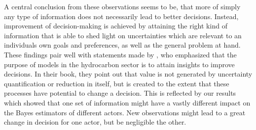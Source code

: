 	A central conclusion from these observations seems to be, that more of simply any type of information does not necessarily lead to better decisions. Instead, improvement of decision-making is achieved by attaining the right kind of information that is able to shed light on uncertainties which are relevant to an individuals own goals and preferences, as well as the general problem at hand. These findings pair well with statements made by \citet{bratvold2010making}, who emphasized that the purpose of models in the hydrocarbon sector is to attain insights to improve decisions. In their book, they point out that value is not generated by uncertainty quantification or reduction in itself, but is created to the extent that these processes have potential to change a decision. This is reflected by our results which showed that one set of information might have a vastly different impact on the Bayes estimators of different actors. New observations might lead to a great change in decision for one actor, but be negligible the other.\\	
